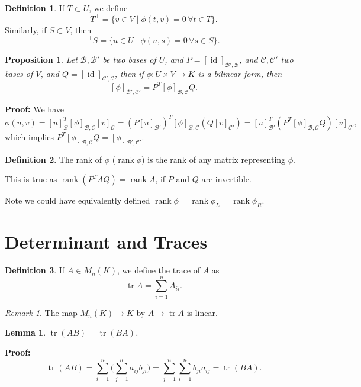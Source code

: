 \documentclass[12pt]{article}
\DeclareMathOperator{\rank}{rank}
\DeclareMathOperator{\tr}{tr}
\DeclareMathOperator{\id}{id}
\newtheorem{lemma}{Lemma}[section]
\newtheorem{proposition}{Proposition}[section]
\theoremstyle{definition}
\newtheorem{definition}{Definition}[section]
\theoremstyle{remark}
\newtheorem*{remark}{Remark}
\begin{document}
\begin{definition}
	If $T \subset U$, we define
	\[
		T^{\perp} = \{v \in V \mid \phi(t, v) = 0 \, \forall t \in T\}
	.\]
	Similarly, if $S \subset V$, then
	\[
		^{\perp}S = \{u \in U \mid \phi(u, s) = 0 \, \forall s \in S\}
	.\]
\end{definition}

\begin{proposition}
	Let $\mathcal{B}, \mathcal{B}'$ be two bases of $U$, and $P = [\id]_{\mathcal{B}', \mathcal{B}}$, and $\mathcal{C}, \mathcal{C}'$ two bases of $V$, and $Q = [\id]_{\mathcal{C}', \mathcal{C}}$, then if $\phi: U \times V \to K$ is a bilinear form, then
	\[
		[\phi]_{\mathcal{B}', \mathcal{C}'} = P^{T} [\phi]_{\mathcal{B}, \mathcal{C}} Q
	.\]
\end{proposition}

\begin{adjustbox}{minipage = \columnwidth - 25.5pt, margin=1em, frame=1pt, margin=0em}
\textbf{Proof:} We have
\[
	\phi(u, v) = [u]_{\mathcal{B}}^{T} [\phi]_{\mathcal{B}, \mathcal{C}}[v]_{\mathcal{C}} = (P[u]_{\mathcal{B}'})^{T}[\phi]_{\mathcal{B},\mathcal{C}}(Q[v]_{\mathcal{C}'}) = [u]_{\mathcal{B}'}^{T} (P^{T} [\phi]_{\mathcal{B}, \mathcal{C}} Q)[v]_{\mathcal{C}'}
,\]
which implies $P^{T}[\phi]_{\mathcal{B}, \mathcal{C}}Q = [\phi]_{\mathcal{B}', \mathcal{C}'}$.
\end{adjustbox}

\begin{definition}
	The rank of $\phi$ ($\rank \phi$) is the rank of any matrix representing $\phi$.
\end{definition}

This is true as $\rank (P^{T}AQ) = \rank A$, if $P$ and $Q$ are invertible.

Note we could have equivalently defined $\rank \phi = \rank \phi_L = \rank \phi_R$.

\newpage

\section{Determinant and Traces}%
\label{sec:determinant_and_traces}

\begin{definition}
	If $A \in M_{n}(K)$, we define the trace of $A$ as
	\[
	\tr A = \sum_{i = 1}^{n} A_{ii}
	.\]
\end{definition}

\begin{remark}
	The map $M_n(K) \to K$ by $A \mapsto \tr A$ is linear.
\end{remark}

\begin{lemma}
	$\tr (AB) = \tr (BA)$.
\end{lemma}

\begin{adjustbox}{minipage = \columnwidth - 25.5pt, margin=1em, frame=1pt, margin=0em}
\textbf{Proof:}
\[
	\tr (AB) = \sum_{i = 1}^{n} \Biggl( \sum_{j = 1}^{n} a_{ij} b_{ji} \Biggr) = \sum_{j = 1}^{n} \sum_{i = 1}^{n} b_{ji} a_{ij} = \tr (BA)
.\]
\end{adjustbox}


\newpage

\printindex
\end{document}

